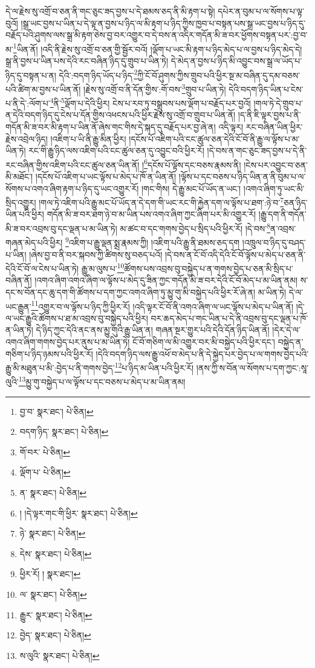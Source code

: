 དེ་ལ་རྗེས་སུ་འགྲོ་བ་ཅན་ནི་གང་ཅུང་ཟད་བྱས་པ་དེ་ཐམས་ཅད་ནི་མི་རྟག་པ་སྟེ། དཔེར་ན་བུམ་པ་ལ་སོགས་པ་ལྟ་བུའོ། །སྒྲ་ཡང་བྱས་པ་ཡིན་པ་དེ་ལྟ་ན་བྱས་པ་ཉིད་ལ་མི་རྟག་པ་ཉིད་ཀྱིས་ཁྱབ་པ་བསྟན་པས་སྒྲ་ཡང་བྱས་པ་ཉིད་དུ་བརྗོད་པའི་ཤུགས་ལས་སྒྲ་མི་རྟག་ཅེས་བྱ་བར་འགྱུར་བ་དེ་བས་ན་འདིར་གདོན་མི་ཟ་བར་ཕྱོགས་བསྟན་པར་:བྱ་བ་མ་\footnote{བྱ་བ་  སྣར་ཐང་།  པེ་ཅིན། }ཡིན་ནོ། །འདི་ནི་རྗེས་སུ་འགྲོ་བ་ཅན་གྱི་སྦྱོར་བའོ། །ལྡོག་པ་ཡང་མི་རྟག་པ་ཉིད་མེད་པ་ལ་བྱས་པ་ཉིད་མེད་དེ། སྒྲ་ནི་བྱས་པ་ཡིན་པས་དེའི་རང་བཞིན་ཉིད་དུ་གྲུབ་པ་ཡིན་ཏེ། དེ་མེད་ན་བྱས་པ་ཉིད་མི་འབྱུང་བས་སྒྲ་ལ་ཡོད་པ་ཉིད་དུ་བསྟན་པ་ན། དེའི་:བདག་ཉིད་ཡོད་པ་ཉིད་\footnote{བདག་ཉིད་  སྣར་ཐང་།  པེ་ཅིན། }ཀྱི་ངོ་བོ་ཤུགས་ཀྱིས་གྲུབ་པའི་ཕྱིར་སྔ་མ་བཞིན་དུ་དམ་བཅས་པའི་ཚིག་མ་བྱས་པ་ཡིན་ནོ། །རྗེས་སུ་འགྲོ་བ་ནི་དོན་གྱིས་:གོ་བས་\footnote{གོ་བར་  པེ་ཅིན། }གྲུབ་པ་ཡིན་ཏེ། དེའི་བདག་ཉིད་ཡིན་པ་ངེས་པ་ནི་དེ་:ལོག་པ་\footnote{ལྡོག་པ་  པེ་ཅིན། }ནི་\footnote{ན་  སྣར་ཐང་།  པེ་ཅིན། }ལྡོག་པ་དེའི་ཕྱིར། ངེས་པ་རབ་ཏུ་བསྒྲུབས་པས་ལྡོག་པ་བརྗོད་པར་བྱའོ། །གལ་ཏེ་དེ་གྲུབ་པ་ན་དེའི་བདག་ཉིད་དུ་ངེས་པ་དོན་གྱིས་འཕངས་པའི་ཕྱིར་རྗེས་སུ་འགྲོ་བ་གྲུབ་པ་ཡིན་ནོ། །ད་ནི་ཇི་ལྟར་བྱས་པ་ནི་གདོན་མི་ཟ་བར་མི་རྟག་པ་ཡིན་ནོ་ཞེས་གང་གིས་དེ་སྐད་དུ་བརྗོད་པར་བྱ་ཞེ་ན། འདི་ལྟར། རང་བཞིན་ཡིན་ཕྱིར་རྗེས་འབྲེལ་ཉིད། །འཇིག་པ་ཡི་ནི་རྒྱུ་མིན་ཕྱིར། །དངོས་པོ་འཇིག་པའི་ངང་ཚུལ་ཅན་དེའི་ངོ་བོ་ནི་རྒྱུ་ལ་ལྟོས་པ་མ་ཡིན་ཏེ། རང་གི་རྒྱུ་ཉིད་ལས་འཇིག་པའི་ངང་ཚུལ་ཅན་དུ་འབྱུང་བའི་ཕྱིར་རོ། །དེ་བས་ན་གང་ཅུང་ཟད་བྱས་པ་དེ་ནི་རང་བཞིན་གྱིས་འཇིག་པའི་ངང་ཚུལ་ཅན་ཡིན་ནོ། །\footnote{། །དེ་ལྟར་གང་གི་ཕྱིར་  སྣར་ཐང་།  པེ་ཅིན། }དངོས་པོ་ལྟོས་དང་བཅས་རྣམས་ནི། །ངེས་པར་འབྱུང་བ་ཅན་མི་མཐོང་། །དངོས་པོ་འཇིག་པ་ཡང་ལྟོས་པ་མེད་པ་ཁོ་ན་ཡིན་ནོ། །ལྟོས་པ་དང་བཅས་པ་ཉིད་ཡིན་ན་ནི་བུམ་པ་ལ་སོགས་པ་འགའ་ཞིག་རྟག་པ་ཉིད་དུ་ཡང་འགྱུར་རོ། །གང་གིས། དེ་རྒྱུ་མང་པོ་ཡོད་ན་ཡང་། །འགའ་ཞིག་ཏུ་ཡང་མི་སྲིད་འགྱུར། །གལ་ཏེ་འཇིག་པའི་རྒྱུ་མང་པོ་ཡོད་ན་དེ་དག་གི་ཡང་རང་གི་རྐྱེན་དག་ལ་ལྟོས་པ་ཐག་:ཉེ་བ་\footnote{ཉེ་  སྣར་ཐང་།  པེ་ཅིན། }ཅན་ཉིད་ཡིན་པའི་ཕྱིར། གདོན་མི་ཟ་བར་ཐག་ཉེ་བ་མ་ཡིན་པས་འགའ་ཞིག་ཀྱང་ཞིག་པར་མི་འགྱུར་རོ། །རྒྱུ་དག་ནི་གདོན་མི་ཟ་བར་འབྲས་བུ་དང་ལྡན་པ་མ་ཡིན་ཏེ། མ་ཚང་བ་དང་གགས་བྱེད་པ་སྲིད་པའི་ཕྱིར་རོ། །དེ་བས་\footnote{དེས་  སྣར་ཐང་།  པེ་ཅིན། }ན་འབྲས་གཞན་མེད་པའི་ཕྱིར། \footnote{ཕྱིར་རོ། །   སྣར་ཐང་། }འཇིག་པ་རྒྱུ་ལྡན་སྨྲ་རྣམས་ཀྱི། །འཇིག་པའི་རྒྱུ་ནི་ཐམས་ཅད་དག །འཁྲུལ་བ་ཉིད་དུ་བཤད་པ་ཡིན། །ཞེས་བྱ་བ་ནི་བར་སྐབས་ཀྱི་ཚིགས་སུ་བཅད་པའོ། །དེ་བས་ན་ངོ་བོ་འདི་དེའི་ངོ་བོ་ལྟོས་པ་མེད་པ་ཅན་ནི་དེའི་ངོ་བོ་ལ་ངེས་པ་ཡིན་ཏེ། རྒྱུ་མ་ལུས་པ་\footnote{ལ་  སྣར་ཐང་།  པེ་ཅིན། }ཚོགས་པས་འབྲས་བུ་བསྐྱེད་པ་ན་གགས་བྱེད་པ་ཅན་མི་སྲིད་པ་བཞིན་ནོ། །འགའ་ཞིག་འགའ་ཞིག་ལ་ལྟོས་པ་མེད་དུ་ཟིན་ཀྱང་གདོན་མི་ཟ་བར་དེའི་ངོ་བོ་མེད་པ་མ་ཡིན་ནམ། ས་དང་ས་བོན་དང་ཆུ་དག་གི་ཚོགས་པ་དག་ཀྱང་འགའ་ཞིག་ཏུ་མྱུ་གུ་མི་བསྐྱེད་པའི་ཕྱིར་རོ་ཞེ་ན། མ་ཡིན་ཏེ། དེ་ལ་ཡང་རྒྱུན་\footnote{རྒྱུར་  སྣར་ཐང་།  པེ་ཅིན། }འགྱུར་བ་ལ་ལྟོས་པ་ཉིད་ཀྱི་ཕྱིར་རོ། །འདི་ལྟར་ངོ་བོ་ནི་འགའ་ཞིག་ལ་ཡང་ལྟོས་པ་མེད་པ་ཡིན་ནོ། །དེ་ལ་ཡང་རྒྱུའི་ཚོགས་པ་ཐ་མ་འབྲས་བུ་བསྐྱེད་པའི་ཕྱིར། བར་ཆད་མེད་པ་གང་ཡིན་པ་དེ་ནི་འབྲས་བུ་དང་ལྡན་པ་ཁོ་ན་ཡིན་ཏེ། དེ་ཉིད་ཀྱང་དེའི་ནང་ནས་མྱུ་གུའི་རྒྱུ་ཡིན་ན། གཞན་སྔར་གྱུར་པའི་དེའི་དོན་ཉིད་ཡིན་ནོ། །དེར་དེ་ལ་འགའ་ཞིག་གགས་བྱེད་པར་ནུས་པ་མ་ཡིན་ཏེ། ངོ་བོ་གཅིག་ལ་མི་འགྱུར་བར་མི་བསྐྱེད་པའི་ཕྱིར་དང་། བསྐྱེད་ན་གཅིག་པ་ཉིད་ཉམས་པའི་ཕྱིར་རོ། །དེའི་བདག་ཉིད་ལས་རྒྱུ་འཕོ་བ་མེད་པ་ནི་དེ་སྐྱེད་པར་བྱེད་པ་ལ་གགས་བྱེད་པའི་རྒྱུ་མི་མཐུན་པ་མི་:བྱེད་པ་ནི་གགས་བྱེད་\footnote{བྱེད་  སྣར་ཐང་།  པེ་ཅིན། }པ་ཉིད་མ་ཡིན་པའི་ཕྱིར་རོ། །ནས་ཀྱི་ས་བོན་ལ་སོགས་པ་དག་ཀྱང་:སཱ་ལུའི་\footnote{ས་ལུའི་  སྣར་ཐང་།  པེ་ཅིན། }མྱུ་གུ་བསྐྱེད་པ་ལ་ལྟོས་པ་དང་བཅས་པ་མེད་པ་མ་ཡིན་ནམ། 